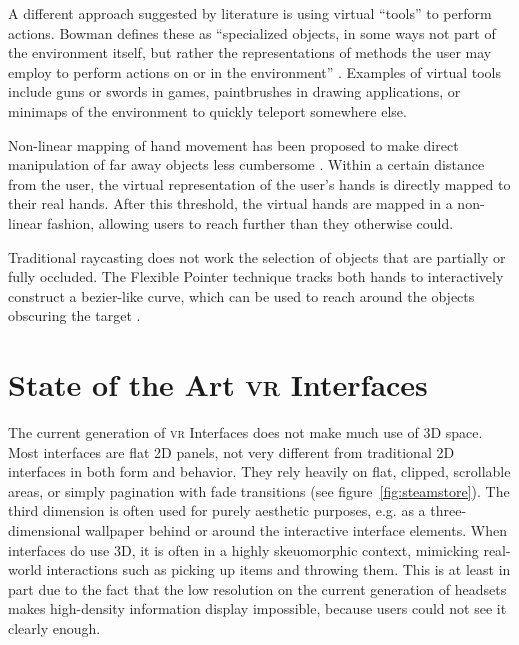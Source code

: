 \documentclass[nobib]{tufte-book} %
\begin{document}
A different approach suggested by literature is using virtual ``tools'' to perform actions. Bowman defines these as ``specialized objects, in some ways not part of the environment itself, but rather the representations of methods the user may employ to perform actions on or in the environment'' \cite{bowman1995user}. Examples of virtual tools include guns or swords in games, paintbrushes in drawing applications, or minimaps of the environment to quickly teleport somewhere else.

Non-linear mapping of hand movement has been proposed to make direct manipulation of far away objects less cumbersome \cite{poupyrev1996go}. Within a certain distance from the user, the virtual representation of the user's hands is directly mapped to their real hands. After this threshold, the virtual hands are mapped in a non-linear fashion, allowing users to reach further than they otherwise could.

Traditional raycasting does not work the selection of objects that are partially or fully occluded. The Flexible Pointer technique tracks both hands to interactively construct a bezier-like curve, which can be used to reach around the objects obscuring the target \cite{feiner2003flexible}.


\section{State of the Art \textsc{vr} Interfaces}
The current generation of \textsc{vr} Interfaces does not make much use of 3D space. Most interfaces are flat 2D panels, not very different from traditional 2D interfaces in both form and behavior. They rely heavily on flat, clipped, scrollable areas, or simply pagination with fade transitions (see figure~\ref{fig:steamstore}). The third dimension is often used for purely aesthetic purposes, e.g. as a three-dimensional wallpaper behind or around the interactive interface elements. When interfaces do use 3D, it is often in a highly skeuomorphic context, mimicking real-world interactions such as picking up items and throwing them.
This is at least in part due to the fact that the low resolution on the current generation of headsets makes high-density information display impossible, because users could not see it clearly enough.
\end{document}
